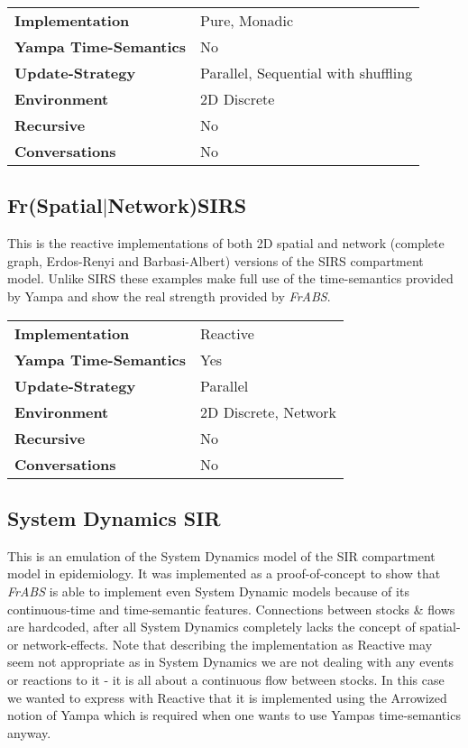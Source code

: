 \begin{center}
\begin{tabular}{l || l }
\textbf{Implementation}			& Pure, Monadic \\
\textbf{Yampa Time-Semantics}	& No \\
\textbf{Update-Strategy}		& Parallel, Sequential with shuffling \\
\textbf{Environment}			& 2D Discrete \\
\textbf{Recursive}				& No \\
\textbf{Conversations}			& No \\
\end{tabular}
\end{center}

\subsection{Fr(Spatial$|$Network)SIRS}
This is the reactive implementations of both 2D spatial and network (complete graph, Erdos-Renyi and Barbasi-Albert) versions of the SIRS compartment model. Unlike SIRS these examples make full use of the time-semantics provided by Yampa and show the real strength provided by \textit{FrABS}.

\begin{center}
\begin{tabular}{l || l }
\textbf{Implementation}			& Reactive \\
\textbf{Yampa Time-Semantics}	& Yes \\
\textbf{Update-Strategy}		& Parallel \\
\textbf{Environment}			& 2D Discrete, Network \\
\textbf{Recursive}				& No \\
\textbf{Conversations}			& No \\
\end{tabular}
\end{center}

\subsection{System Dynamics SIR}
This is an emulation of the System Dynamics model of the SIR compartment model in epidemiology. It was implemented as a proof-of-concept to show that \textit{FrABS} is able to implement even System Dynamic models because of its continuous-time and time-semantic features. Connections between stocks \& flows are hardcoded, after all System Dynamics completely lacks the concept of spatial- or network-effects. Note that describing the implementation as Reactive may seem not appropriate as in System Dynamics we are not dealing with any events or reactions to it - it is all about a continuous flow between stocks. In this case we wanted to express with Reactive that it is implemented using the Arrowized notion of Yampa which is required when one wants to use Yampas time-semantics anyway.

